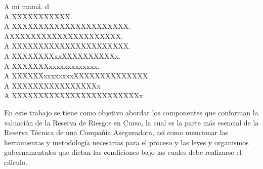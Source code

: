 \documentclass[11pt,twoside,openright,spanish]{report}
\numberwithin{equation}{chapter}
\numberwithin{figure}{chapter}
\numberwithin{table}{chapter}
\begin{document}
	\newpage
	$\ $
	\thispagestyle{empty} %
	
	\begin{acknowledgements}
	 
	A mi mamá. d
	\\

	A XXXXXXXXXXX.
	\\
	
	A XXXXXXXXXXXXXXXXXXXXXX.
	\\
	
	AXXXXXXXXXXXXXXXXXXXXX.
	\\
	
	A XXXXXXXXXXXXXXXXXXXXXX.
	\\
	
	A XXXXXXXXxxXXXXXXXXXXx.
	\\
	
	A XXXXXXXxxxxxxxxxxxxx.   
	\\
	
	A XXXXXXxxxxxxxxXXXXXXXXXXXXXX
	\\
	
	A XXXXXXXXXXXXXXXXx
	\\
	
	A XXXXXXXXXXXXXXXXXXXXXXXXx
	\\
	
		
	\end{acknowledgements}
	
	
	\tableofcontents
	
	
	\addtolength{\headheight}{\baselineskip}
	\pagestyle{fancy}
	\cleardoublepage
		
	\begin{preface}
	\doublespacing
	
	En este trabajo se tiene como objetivo abordar los componentes que conforman la valuación de la Reserva de Riesgos en Curso, la cual es la parte más esencial de la Reserva Técnica de una Compañía Aseguradora, así como mencionar las herramientas y metodología necesarias para el proceso y las leyes y organismos gubernamentales que dictan las condiciones bajo las cuales debe realizarse el cálculo.
		
	\end{preface}
	
\end{document}
